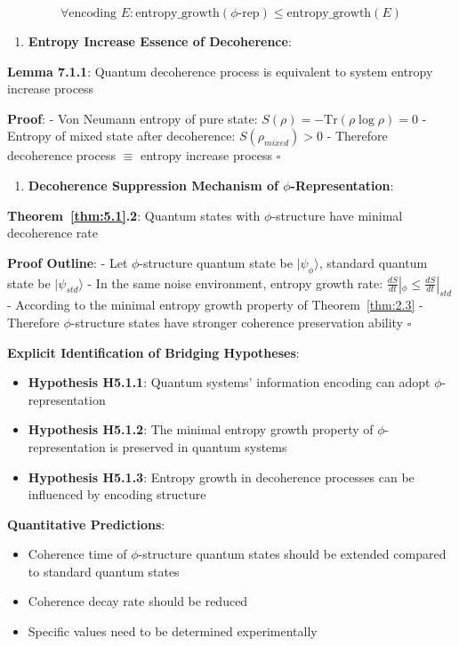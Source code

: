 \begin{equation}
\forall \text{encoding } E: \text{entropy\_growth}(\text{$\phi$-rep}) \leq \text{entropy\_growth}(E)
\end{equation}

\begin{enumerate}
\item \textbf{Entropy Increase Essence of Decoherence}:
\end{enumerate}
   \textbf{Lemma 7.1.1}: Quantum decoherence process is equivalent to system entropy increase process
\label{thm:5.1}
   
   \textbf{Proof}:
   - Von Neumann entropy of pure state: $S(\rho) = -\text{Tr}(\rho \log \rho) = 0$
   - Entropy of mixed state after decoherence: $S(\rho_{mixed}) > 0$
   - Therefore decoherence process $\equiv$ entropy increase process $\square$

\begin{enumerate}
\item \textbf{Decoherence Suppression Mechanism of $\phi$-Representation}:
\end{enumerate}
   \textbf{Theorem~\ref{thm:5.1}.2}: Quantum states with $\phi$-structure have minimal decoherence rate
\label{thm:5.1}
   
   \textbf{Proof Outline}:
   - Let $\phi$-structure quantum state be $|\psi_\phi\rangle$, standard quantum state be $|\psi_{std}\rangle$
   - In the same noise environment, entropy growth rate: $\frac{dS}{dt}|_\phi \leq \frac{dS}{dt}|_{std}$
   - According to the minimal entropy growth property of Theorem~\ref{thm:2.3}
   - Therefore $\phi$-structure states have stronger coherence preservation ability $\square$

\textbf{Explicit Identification of Bridging Hypotheses}:
\begin{itemize}
\item \textbf{Hypothesis H5.1.1}: Quantum systems' information encoding can adopt $\phi$-representation
\item \textbf{Hypothesis H5.1.2}: The minimal entropy growth property of $\phi$-representation is preserved in quantum systems
\item \textbf{Hypothesis H5.1.3}: Entropy growth in decoherence processes can be influenced by encoding structure
\end{itemize}

\textbf{Quantitative Predictions}:
\begin{itemize}
\item Coherence time of $\phi$-structure quantum states should be extended compared to standard quantum states
\item Coherence decay rate should be reduced
\item Specific values need to be determined experimentally
\end{itemize}

